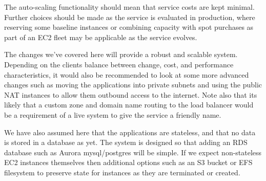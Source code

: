 
The auto-scaling functionality should mean that service costs are kept minimal. Further choices should be made as the service is evaluated in production, where reserving some baseline instances or combining capacity with spot purchases as part of an EC2 fleet may be applicable as the service evolves.


The changes we've covered here will provide a robust and scalable system. Depending on the clients balance between change, cost, and performance characteristics, it would also be recommended to look at some more advanced changes such as moving the applications into private subnets and using the public NAT instances to allow them outbound access to the internet. Note also that its likely that a custom zone and domain name routing to the load balancer would be a requirement of a live system to give the service a friendly name.

We have also assumed here that the applications are stateless, and that no data is stored in a database as yet. The system is designed so that adding an RDS database such as Aurora mysql/postgres will be simple. If we expect non-stateless EC2 instances themselves then additional options such as an S3 bucket or EFS filesystem to preserve state for instances as they are terminated or created.




